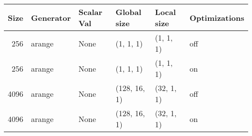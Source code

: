 \begin{tabular}{rlllll}
\toprule
 Size & Generator & Scalar Val &   Global size &  Local size & Optimizations \\
\midrule
  256 &    arange &       None &     (1, 1, 1) &   (1, 1, 1) &           off \\
  256 &    arange &       None &     (1, 1, 1) &   (1, 1, 1) &            on \\
 4096 &    arange &       None &  (128, 16, 1) &  (32, 1, 1) &           off \\
 4096 &    arange &       None &  (128, 16, 1) &  (32, 1, 1) &            on \\
\bottomrule
\end{tabular}
